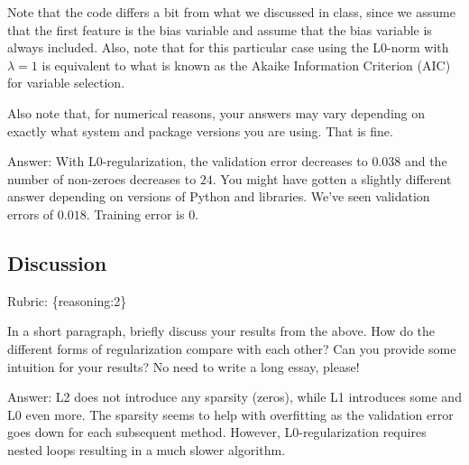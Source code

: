 \documentclass{article}
\def\ans#1{\par\gre{Answer: #1}}
\def\answer#1{\ans{#1}}
\def\rubric#1{\gre{Rubric: \{#1\}}}{}
\def\gre#1{{\color{gre}#1}}
\begin{document}
Note that the code differs a bit from what we discussed in class,
since we assume that the first feature is the bias variable and assume that the
bias variable is always included. Also, note that for this particular case using
the L0-norm with $\lambda=1$ is equivalent to what is known as the Akaike
Information Criterion (AIC) for variable selection.

Also note that, for numerical reasons, your answers may vary depending on exactly what system and package versions you are using. That is fine.

\answer{
With L0-regularization, the validation error decreases to $0.038$ and the number of non-zeroes decreases to $24$.
You might have gotten a slightly different answer depending on versions of Python and libraries.
We've seen validation errors of $0.018$. Training error is 0.
}

\subsection{Discussion}
\rubric{reasoning:2}

In a short paragraph, briefly discuss your results from the above. How do the
different forms of regularization compare with each other?
Can you provide some intuition for your results? No need to write a long essay, please!

\answer{
L2 does not introduce any sparsity (zeros), while L1 introduces some and L0 even more.
The sparsity seems to help with overfitting as the validation error goes down for each subsequent method.
However, L0-regularization requires nested loops resulting in a much slower algorithm.
}
%
%
\end{document}
